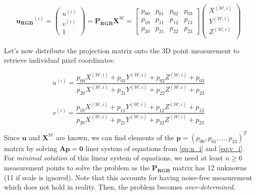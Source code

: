 \documentclass[a4paper]{report}
\numberwithin{figure}{section}
\begin{document}
\begin{equation}
  \mathbf{u_{RGB}}^{(i)} = 
  \begin{pmatrix}
    u^{(i)}\\
    v^{(i)}\\
    1
  \end{pmatrix}
  =
  \mathbf{P_{RGB}}\mathbf{X^{\mathcal{W}}} = 
  \begin{bmatrix}
    p_{00} & p_{01} & p_{02} & p_{03}\\
    p_{10} & p_{11} & p_{12} & p_{13}\\
    p_{20} & p_{21} & p_{22} & p_{23}
  \end{bmatrix}
  \begin{pmatrix}
    X^{(\mathcal{W}, i)}\\
    Y^{(\mathcal{W}, i)}\\
    Z^{(\mathcal{W}, i)}\\
  \end{pmatrix}\label{eq:proj_matrix}
\end{equation} 

Let's now distribute the projection matrix onto the 3D point measurement to 
retrieve individual pixel coordinates:

\begin{equation}\label{eq:u_i}
  u^{(i)} = 
  \frac
  {p_{00}X^{(\mathcal{W}, i)} + p_{01}Y^{(\mathcal{W}, i)} + 
  p_{02}Z^{(\mathcal{W}, i)} + p_{03}}
  {p_{20}X^{(\mathcal{W}, i)} + p_{21}Y^{(\mathcal{W}, i)} + 
  p_{22}Z^{(\mathcal{W}, i)} + p_{23}}
\end{equation} 

\begin{equation}\label{eq:v_i}
  v^{(i)} = 
  \frac
  {p_{10}X^{(\mathcal{W}, i)} + p_{11}Y^{(\mathcal{W}, i)} + 
  p_{12}Z^{(\mathcal{W}, i)} + p_{13}}
  {p_{20}X^{(\mathcal{W}, i)} + p_{21}Y^{(\mathcal{W}, i)} + 
  p_{22}Z^{(\mathcal{W}, i)} + p_{23}}
\end{equation} 


Since $\mathbf{u}$ and $\mathbf{X^{\mathcal{W}}}$ are known, we can find 
elements of the 
$\mathbf{p} = (p_{00}, p_{01}, \dots, p_{23})^T$ matrix by solving 
$\mathbf{Ap=0}$ liner system of equations from \eqref{eq:u_i} and 
\eqref{eq:v_i}.  
For \textit{minimal solution} of this linear system of equations, we need at 
least $n \geq 6$ measurement points to solve the problem as the 
$\mathbf{P_{RGB}}$ matrix has 12 unknowns (11 if scale is ignored).  Note that 
this accounts for having noise-free measurement which does not hold in 
reality. Then, the problem becomes \textit{over-determined}.
\end{document}
